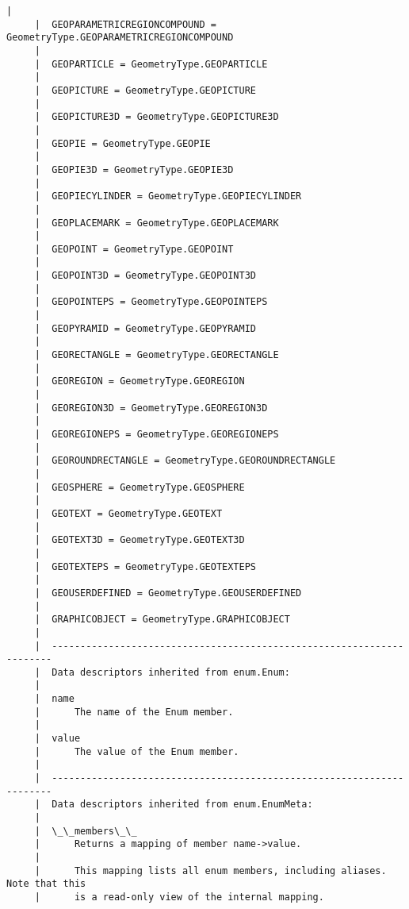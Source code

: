 \documentclass[11pt]{article}
\begin{document}
\begin{Verbatim}[commandchars=\\\{\}]
     |  
     |  GEOPARAMETRICREGIONCOMPOUND = GeometryType.GEOPARAMETRICREGIONCOMPOUND
     |  
     |  GEOPARTICLE = GeometryType.GEOPARTICLE
     |  
     |  GEOPICTURE = GeometryType.GEOPICTURE
     |  
     |  GEOPICTURE3D = GeometryType.GEOPICTURE3D
     |  
     |  GEOPIE = GeometryType.GEOPIE
     |  
     |  GEOPIE3D = GeometryType.GEOPIE3D
     |  
     |  GEOPIECYLINDER = GeometryType.GEOPIECYLINDER
     |  
     |  GEOPLACEMARK = GeometryType.GEOPLACEMARK
     |  
     |  GEOPOINT = GeometryType.GEOPOINT
     |  
     |  GEOPOINT3D = GeometryType.GEOPOINT3D
     |  
     |  GEOPOINTEPS = GeometryType.GEOPOINTEPS
     |  
     |  GEOPYRAMID = GeometryType.GEOPYRAMID
     |  
     |  GEORECTANGLE = GeometryType.GEORECTANGLE
     |  
     |  GEOREGION = GeometryType.GEOREGION
     |  
     |  GEOREGION3D = GeometryType.GEOREGION3D
     |  
     |  GEOREGIONEPS = GeometryType.GEOREGIONEPS
     |  
     |  GEOROUNDRECTANGLE = GeometryType.GEOROUNDRECTANGLE
     |  
     |  GEOSPHERE = GeometryType.GEOSPHERE
     |  
     |  GEOTEXT = GeometryType.GEOTEXT
     |  
     |  GEOTEXT3D = GeometryType.GEOTEXT3D
     |  
     |  GEOTEXTEPS = GeometryType.GEOTEXTEPS
     |  
     |  GEOUSERDEFINED = GeometryType.GEOUSERDEFINED
     |  
     |  GRAPHICOBJECT = GeometryType.GRAPHICOBJECT
     |  
     |  ----------------------------------------------------------------------
     |  Data descriptors inherited from enum.Enum:
     |  
     |  name
     |      The name of the Enum member.
     |  
     |  value
     |      The value of the Enum member.
     |  
     |  ----------------------------------------------------------------------
     |  Data descriptors inherited from enum.EnumMeta:
     |  
     |  \_\_members\_\_
     |      Returns a mapping of member name->value.
     |      
     |      This mapping lists all enum members, including aliases. Note that this
     |      is a read-only view of the internal mapping.
    

\end{Verbatim}
\end{document}
